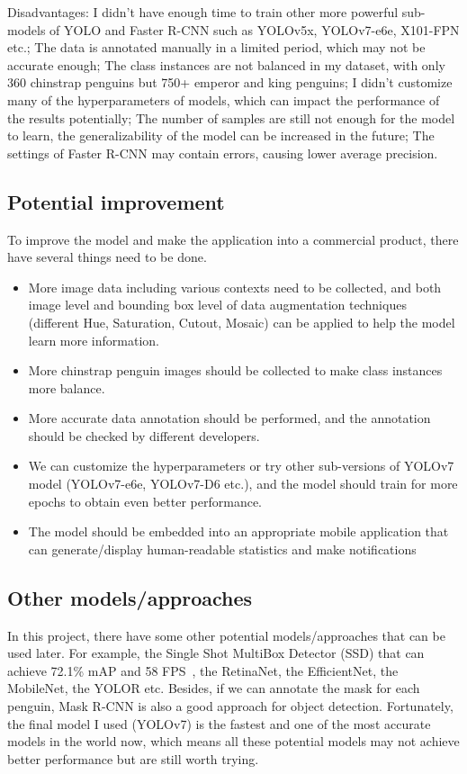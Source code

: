 \documentclass[runningheads]{llncs}
\begin{document}
Disadvantages: I didn't have enough time to train other more powerful sub-models of YOLO and Faster R-CNN such as YOLOv5x, YOLOv7-e6e, X101-FPN etc.; The data is annotated manually in a limited period, which may not be accurate enough; The class instances are not balanced in my dataset, with only 360 chinstrap penguins but 750+ emperor and king penguins; I didn't customize many of the hyperparameters of models, which can impact the performance of the results potentially; The number of samples are still not enough for the model to learn, the generalizability of the model can be increased in the future; The settings of Faster R-CNN may contain errors, causing lower average precision.

\subsection{Potential improvement}
To improve the model and make the application into a commercial product, there have several things need to be done. 
\begin{itemize}
    \item More image data including various contexts need to be collected, and both image level and bounding box level of data augmentation techniques (different Hue, Saturation, Cutout, Mosaic) can be applied to help the model learn more information.
    \item More chinstrap penguin images should be collected to make class instances more balance.
    \item More accurate data annotation should be performed, and the annotation should be checked by different developers.
    \item We can customize the hyperparameters or try other sub-versions of YOLOv7 model (YOLOv7-e6e, YOLOv7-D6 etc.), and the model should train for more epochs to obtain even better performance.
    \item The model should be embedded into an appropriate mobile application that can generate/display human-readable statistics and make notifications
\end{itemize}


\subsection{Other models/approaches}
In this project, there have some other potential models/approaches that can be used later. For example, the Single Shot MultiBox Detector (SSD) that can achieve 72.1\% mAP and 58 FPS~\cite{ssd}, the RetinaNet, the EfficientNet, the MobileNet, the YOLOR etc. Besides, if we can annotate the mask for each penguin, Mask R-CNN is also a good approach for object detection. Fortunately, the final model I used (YOLOv7) is the fastest and one of the most accurate models in the world now, which means all these potential models may not achieve better performance but are still worth trying. 
\end{document}
